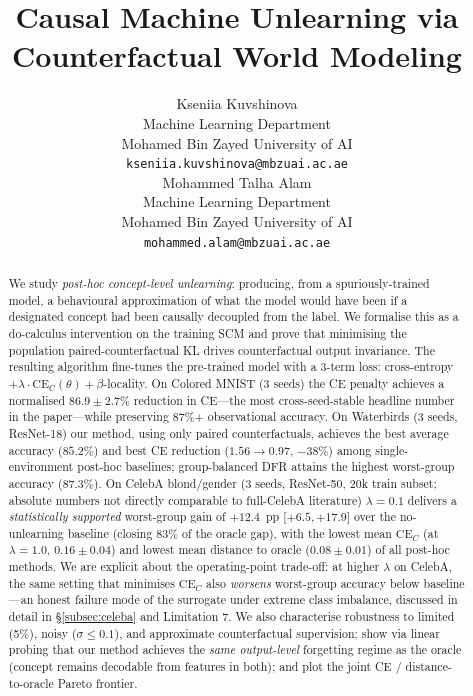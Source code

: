\documentclass{article}
\title{Causal Machine Unlearning via Counterfactual World Modeling}
\author{
  Kseniia Kuvshinova \\
  Machine Learning Department \\
  Mohamed Bin Zayed University of AI \\
  \texttt{kseniia.kuvshinova@mbzuai.ac.ae} \\
  \And
  Mohammed Talha Alam \\
  Machine Learning Department \\
  Mohamed Bin Zayed University of AI \\
  \texttt{mohammed.alam@mbzuai.ac.ae}
}
\newcommand{\CE}{\mathrm{CE}}
\begin{document}
\maketitle

\begin{abstract}
We study \emph{post-hoc concept-level unlearning}: producing, from a
spuriously-trained model, a behavioural approximation of what the model would
have been if a designated concept had been causally decoupled from the label.
We formalise this as a do-calculus intervention on the training SCM and prove
that minimising the population paired-counterfactual KL drives counterfactual
output invariance.  The resulting algorithm fine-tunes the pre-trained model
with a 3-term loss: cross-entropy $+\lambda\!\cdot\!\CE_C(\theta) + \beta$-locality.
On Colored MNIST (3 seeds) the CE penalty achieves a normalised
$86.9 \pm 2.7\%$ reduction in CE---the most cross-seed-stable headline number
in the paper---while preserving 87\%+ observational accuracy.
On Waterbirds (3 seeds, ResNet-18) our method, using only paired
counterfactuals, achieves the best average accuracy ($85.2\%$) and best CE
reduction ($1.56\!\to\!0.97$, $-38\%$) among single-environment post-hoc
baselines; group-balanced DFR \cite{kirichenko2023last} attains the highest
worst-group accuracy ($87.3\%$).  On CelebA blond/gender (3 seeds, ResNet-50,
20k train subset; absolute numbers not directly comparable to full-CelebA
literature) $\lambda{=}0.1$ delivers a \emph{statistically supported}
worst-group gain of $+12.4$~pp [$+6.5, +17.9$] over the no-unlearning
baseline (closing 83\% of the oracle gap), with the lowest mean $\CE_C$
(at $\lambda{=}1.0$, $0.16 \pm 0.04$) and lowest mean distance to oracle
($0.08 \pm 0.01$) of all post-hoc methods.  We are explicit about the
operating-point trade-off: at higher $\lambda$ on CelebA, the same setting
that minimises $\CE_C$ also \emph{worsens} worst-group accuracy below
baseline---an honest failure mode of the surrogate under extreme class
imbalance, discussed in detail in \S\ref{subsec:celeba} and Limitation 7.
We also characterise robustness to limited (5\%), noisy ($\sigma\!\le\!0.1$),
and approximate counterfactual supervision; show via linear probing that our
method achieves the \emph{same output-level} forgetting regime as the
oracle (concept remains decodable from features in both); and plot the joint
CE / distance-to-oracle Pareto frontier.
\end{abstract}
\end{document}

